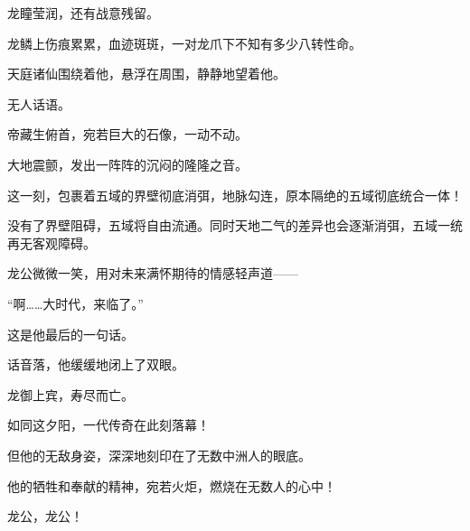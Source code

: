 \begin{this_body}
龙瞳莹润，还有战意残留。

龙鳞上伤痕累累，血迹斑斑，一对龙爪下不知有多少八转性命。

天庭诸仙围绕着他，悬浮在周围，静静地望着他。

无人话语。

帝藏生俯首，宛若巨大的石像，一动不动。

大地震颤，发出一阵阵的沉闷的隆隆之音。

这一刻，包裹着五域的界壁彻底消弭，地脉勾连，原本隔绝的五域彻底统合一体！

没有了界壁阻碍，五域将自由流通。同时天地二气的差异也会逐渐消弭，五域一统再无客观障碍。

龙公微微一笑，用对未来满怀期待的情感轻声道——

“啊……大时代，来临了。”

这是他最后的一句话。

话音落，他缓缓地闭上了双眼。

龙御上宾，寿尽而亡。

如同这夕阳，一代传奇在此刻落幕！

但他的无敌身姿，深深地刻印在了无数中洲人的眼底。

他的牺牲和奉献的精神，宛若火炬，燃烧在无数人的心中！

龙公，龙公！

\end{this_body}
